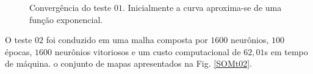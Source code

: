 \begin{figure}[H]
	\centering
	\setlength{\fboxsep}{8pt}
	\setlength{\fboxrule}{0.1pt}
	\caption{Convergência do teste $01$. Inicialmente a curva aproxima-se de uma função exponencial.}
	\label{Conv01}
\end{figure} 


O teste $02$ foi conduzido em uma malha composta por $1600$ neurônios, $100$ épocas, $1600$ neurônios vitoriosos e um custo computacional de $62,01$s em tempo de máquina. o conjunto de mapas apresentados na Fig. \ref{SOMt02}.

